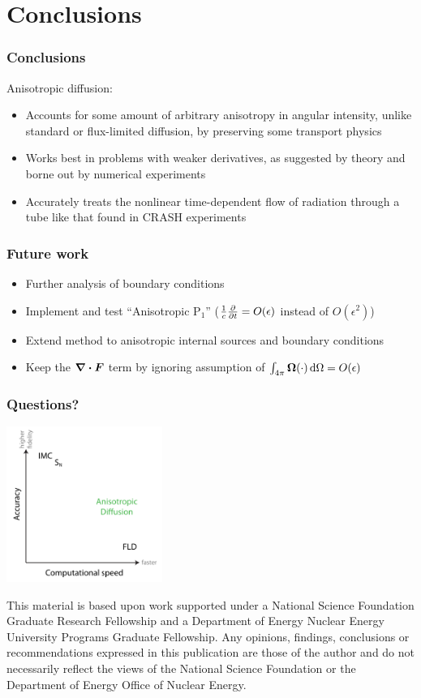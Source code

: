 \documentclass{beamer}
\begin{document}
\section{Conclusions}
\begin{frame}
  \frametitle{Conclusions}
  Anisotropic diffusion:
  \begin{itemize}
    \item Accounts for some amount of arbitrary anisotropy in
      angular intensity, unlike standard or flux-limited diffusion, by
      preserving some transport physics
    \item Works best in problems with weaker derivatives, as suggested by
      theory and borne out by numerical experiments
    \item Accurately treats the nonlinear time-dependent flow of radiation
      through a tube like that found in CRASH experiments
  \end{itemize}
\end{frame}
\begin{frame}
  \frametitle{Future work}
  \begin{itemize}
    \item Further analysis of boundary conditions
    \item Implement and test ``Anisotropic P$_1$''
      ($\frac1c\frac{\partial }{\partial t}=O(\epsilon)$ instead of $O(\epsilon^2)$)
    \item Extend method to anisotropic internal sources and boundary conditions
    \item Keep the $\bm{\nabla} \bm{\cdot} \bm{F}$ term by ignoring assumption of
      $\int_{4\pi} \bm{\Omega} (\cdot) \mathop{}\!\mathrm{d} \Omega = O(\epsilon)$ 
  \end{itemize}
\end{frame}
\appendix
\begin{frame}
  \frametitle{Questions?}
  \begin{center}
    \includegraphics[width=2in]{../figures/fidelity2}
  \end{center}
{\setlength{\baselineskip}{-\baselineskip} \tiny 
This material is based upon work supported under a National Science Foundation
Graduate Research Fellowship and a Department of Energy Nuclear Energy
University Programs Graduate Fellowship. Any opinions, findings, conclusions or
recommendations expressed in this publication are those of the author and do
not necessarily reflect the views of the National Science Foundation or the
Department of Energy Office of Nuclear Energy.\par}
\end{frame}
\end{document}
